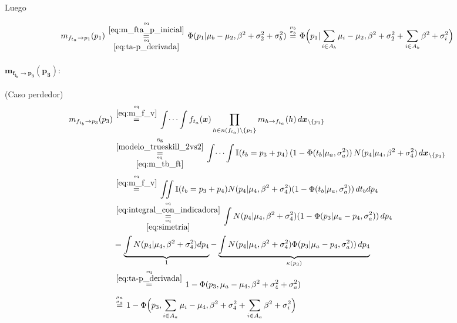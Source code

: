 \documentclass[article]{jss}
\newcommand\hfrac[2]{\genfrac{}{}{0pt}{}{#1}{#2}} %
\begin{document}
\begin{appendix}
Luego

\begin{equation}\label{eq:m_fta_p}
 m_{f_{t_a} \rightarrow p_1}(p_1) \overset{\hfrac{\text{eq}}{\ref{eq:m_fta_p_inicial}}}{\underset{\hfrac{\text{eq}}{\ref{eq:ta-p_derivada}}}{=}}  \Phi(p_1| \mu_b - \mu_2, \beta^2 + \sigma_2^2 + \sigma_b^2)  \overset{\hfrac{\mu_b}{\sigma_b}}{=}  \Phi\Big(p_1| \sum_{i \in A_b} \mu_i - \mu_2, \beta^2 + \sigma_2^2 + \sum_{i \in A_b} \beta^2 + \sigma_i^2 \Big)
\end{equation}

\paragraph{$\bm{m_{f_{t_b} \rightarrow p_3}(p_3)}:$} (Caso perdedor)
\begin{equation}\label{eq:m_ftb_p}
\begin{split}
m_{f_{t_b} \rightarrow p_3}(p_3)&\overset{\hfrac{\text{eq}}{\ref{eq:m_f_v}}}{=} \int \dots \int f_{t_a}(\bm{x}) \prod_{h \in n(f_{t_a}) \setminus \{p_1\} } m_{h \rightarrow f_{t_a}}(h) \, d\bm{x}_{\setminus \{p_1\} }  \\
&\overset{\hfrac{\text{fig}}{\ref{modelo_trueskill_2vs2}}}{\underset{\hfrac{\text{eq}}{\ref{eq:m_tb_ft}}}{=}} \int \dots \int \mathbb{I}( t_b = p_3 + p_4) \, (1-\Phi (t_b| \mu_a , \sigma_a^2 )) \, N(p_4| \mu_4, \beta^2 + \sigma_4^2 ) \, d\bm{x}_{\setminus \{p_3\} }\\[0.1cm]
&\overset{\hfrac{\text{eq}}{\ref{eq:m_f_v}}}{=} \iint \mathbb{I}( t_b = p_3 + p_4) N(p_4| \mu_4, \beta^2 + \sigma_4^2 )  (1 - \Phi (t_b| \mu_a , \sigma_a^2) )\, dt_b dp_4 \\
&\overset{\hfrac{\text{eq}}{\ref{eq:integral_con_indicadora}}}{\underset{\hfrac{\text{eq}}{\ref{eq:simetria}}}{=}} \int N(p_4| \mu_4, \beta^2 + \sigma_4^2 )  (1 - \Phi (p_3 | \mu_a - p_4 , \sigma_a^2 ) ) \,  dp_4 \\
& =  \underbrace{\int N(p_4| \mu_4, \beta^2 + \sigma_4^2 )dp_4}_{1}  -  \underbrace{\int N(p_4| \mu_4, \beta^2 + \sigma_4^2 ) \Phi (p_3 | \mu_a - p_4 , \sigma_a^2 ) ) \, dp_4}_{\kappa(p_3)} \\
&\overset{\hfrac{\text{eq}}{\ref{eq:ta-p_derivada}}}{=} 1 - \Phi(p_3, \mu_a  - \mu_4, \beta^2 + \sigma_4^2 + \sigma_a^2)\\[0.1cm]
&\overset{\hfrac{\mu_a}{\sigma_a}}{=} 1 - \Phi\Big(p_3, \sum_{i \in A_a} \mu_i  - \mu_4, \beta^2 + \sigma_4^2 + \sum_{i \in A_a} \beta^2 + \sigma_i^2  \Big)
\end{split}
\end{equation}


\end{appendix}
\end{document}
